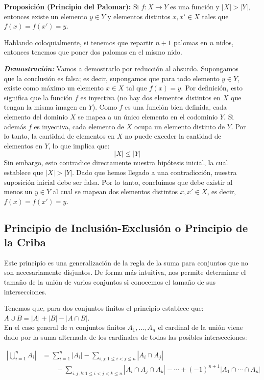 \documentclass[12pt]{article}
\theoremstyle{definition}
\theoremstyle{plain}
\theoremstyle{plain}
\theoremstyle{definition}
\begin{document}
        \textbf{Proposición (Principio del Palomar):}
        Si \(f:X \rightarrow Y\) es una función y \(|X| > |Y|\), entonces existe un elemento \(y \in Y\) y elementos distintos \(x,x' \in X\) tales que \(f(x) = f(x') = y\).

        Hablando coloquialmente, si tenemos que repartir \(n+1\) palomas en \(n\) nidos, entonces tenemos que poner dos palomas en el mismo nido.

        \textbf{\textit{Demostración:}}
        Vamos a demostrarlo por reducción al absurdo. Supongamos que la conclusión es falsa; es decir, supongamos que para todo elemento $y \in Y$, existe como máximo un elemento $x \in X$ tal que $f(x) = y$. Por definición, esto significa que la función $f$ es inyectiva (no hay dos elementos distintos en $X$ que tengan la misma imagen en $Y$). Como $f$ es una función bien definida, cada elemento del dominio $X$ se mapea a un único elemento en el codominio $Y$. Si además $f$ es inyectiva, cada elemento de $X$ ocupa un elemento distinto de $Y$. Por lo tanto, la cantidad de elementos en $X$ no puede exceder la cantidad de elementos en $Y$, lo que implica que:$$|X| \leq |Y|$$Sin embargo, esto contradice directamente nuestra hipótesis inicial, la cual establece que $|X| > |Y|$. Dado que hemos llegado a una contradicción, nuestra suposición inicial debe ser falsa. Por lo tanto, concluimos que debe existir al menos un $y \in Y$ al cual se mapean dos elementos distintos $x, x' \in X$, es decir, $f(x) = f(x') = y$.

    \subsection{Principio de Inclusión-Exclusión o Principio de la Criba}

        Este principio es una generalización de la regla de la suma para conjuntos que no son necesariamente disjuntos. De forma más intuitiva, nos permite determinar el tamaño de la unión de varios conjuntos si conocemos el tamaño de sus intersecciones.

        Tenemos que, para dos conjuntos finitos el principio establece que: \(A \cup B = |A| + |B| - |A \cap B|\).\\
        En el caso general de \(n\) conjuntos finitos \(A_1, \dots, A_n\) el cardinal de la unión viene dado por la suma alternada de los cardinales de todas las posibles intersecciones:

        $$\begin{aligned}
            \left| \bigcup_{i=1}^n A_i \right| &= \sum_{i=1}^n |A_i| - \sum_{i,j : 1 \le i < j \le n} |A_i \cap A_j| \\
            &\qquad + \sum_{i,j,k : 1 \le i < j < k \le n} |A_i \cap A_j \cap A_k| - \cdots + (-1)^{n+1} |A_1 \cap \cdots \cap A_n|
        \end{aligned}$$
\end{document}
